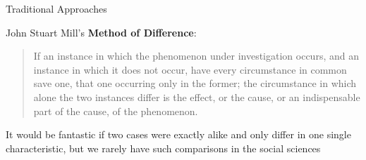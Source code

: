 \documentclass{beamer}
\numberwithin{equation}{section}
\begin{document}
\begin{frame}

\centering
{}

\end{frame}

\begin{frame}{Traditional Approaches}

John Stuart Mill's \textbf{Method of Difference}:\medskip

\begin{quote}
If an instance in which the phenomenon under investigation occurs, and
an instance in which it does not occur, have every circumstance in
common save one, that one occurring only in the former; the circumstance
in which alone the two instances differ is the effect, or the cause, or
an indispensable part of the cause, of the phenomenon.
\end{quote}\medskip




\pause

It would be fantastic if two cases were exactly alike and only differ in one single characteristic, but we rarely have such comparisons in the social sciences 


\end{frame}
\end{document}
